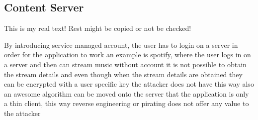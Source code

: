 \subsection{Content Server} \label{subsection:counter-external-service}
This is my real text! Rest might be copied or not be checked!

By introducing service managed account, the user has to login on a server in order for the application to work
an example is spotify, where the user logs in on a server and then can stream music
without account it is not possible to obtain the stream details and even though when the stream details are obtained they can be encrypted with a user specific key the attacker does not have
this way also an awesome algorithm can be moved onto the server that the application is only a thin client, this way reverse engineering or pirating does not offer any value to the attacker
